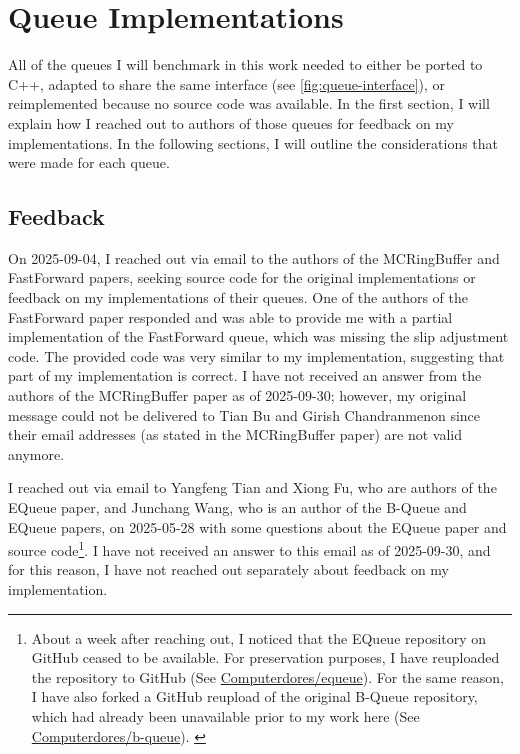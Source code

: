 \chapter{Queue Implementations}
All of the queues I will benchmark in this work needed to either be ported to C++, adapted to share the same
interface (see \autoref{fig:queue-interface}), or reimplemented because no source code was available.
In the first section, I will explain how I reached out to authors of those queues for feedback on my implementations.
In the following sections, I will outline the considerations that were made for each queue.

\section{Feedback}
On 2025-09-04, I reached out via email to the authors of the MCRingBuffer and FastForward papers, seeking
source code for the original implementations or feedback on my implementations of their queues.
One of the authors of the FastForward paper responded and was able to provide me with a partial
implementation of the FastForward queue, which was missing the slip adjustment code.
The provided code was very similar to my implementation, suggesting that part of my implementation is correct.
I have not received an answer from the authors of the MCRingBuffer paper as of 2025-09-30; however, my
original message could not be delivered to Tian Bu and Girish Chandranmenon since their email addresses (as
stated in the MCRingBuffer paper) are not valid anymore.

I reached out via email to Yangfeng Tian and Xiong Fu, who are authors of the EQueue paper, and Junchang
Wang, who is an author of the B-Queue and EQueue papers, on 2025-05-28 with some questions about the EQueue
paper and source code\footnote{About a week after reaching out,
    I noticed that the EQueue repository on GitHub ceased to be available.
    For preservation purposes, I have reuploaded the repository to GitHub (See
    \href{https://github.com/Computerdores/equeue}{Computerdores/equeue}).
    For the same reason, I have also forked a GitHub reupload of the original B-Queue
    repository, which had already been unavailable prior to my work here (See
    \href{https://github.com/Computerdores/b-queue}{Computerdores/b-queue}).
\label{equeue-bqueue-links}}.
I have not received an answer to this email as of 2025-09-30, and for this reason, I have not reached out separately
about feedback on my implementation.

